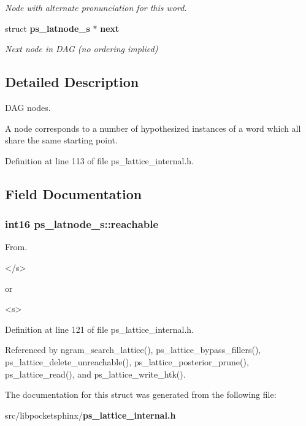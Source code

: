 \begin{DoxyCompactItemize}
\begin{DoxyCompactList}\small\item\em Node with alternate pronunciation for this word. \end{DoxyCompactList}\item 
struct {\bf ps\-\_\-latnode\-\_\-s} $\ast$ {\bf next}\label{structps__latnode__s_aca6f3d543a1712a1ca3bb8ec60f71c84}

\begin{DoxyCompactList}\small\item\em Next node in D\-A\-G (no ordering implied) \end{DoxyCompactList}\end{DoxyCompactItemize}


\subsection{Detailed Description}
D\-A\-G nodes. 

A node corresponds to a number of hypothesized instances of a word which all share the same starting point. 

Definition at line 113 of file ps\-\_\-lattice\-\_\-internal.\-h.



\subsection{Field Documentation}
\subsubsection[{reachable}]{\setlength{\rightskip}{0pt plus 5cm}int16 ps\-\_\-latnode\-\_\-s\-::reachable}\label{structps__latnode__s_af9c4c69f5f85bbc36818357a52432565}


From. 

\begin{DoxyVerb}</s> \end{DoxyVerb}
 or\begin{DoxyVerb}<s> \end{DoxyVerb}
 

Definition at line 121 of file ps\-\_\-lattice\-\_\-internal.\-h.



Referenced by ngram\-\_\-search\-\_\-lattice(), ps\-\_\-lattice\-\_\-bypass\-\_\-fillers(), ps\-\_\-lattice\-\_\-delete\-\_\-unreachable(), ps\-\_\-lattice\-\_\-posterior\-\_\-prune(), ps\-\_\-lattice\-\_\-read(), and ps\-\_\-lattice\-\_\-write\-\_\-htk().



The documentation for this struct was generated from the following file\-:\begin{DoxyCompactItemize}
\item 
src/libpocketsphinx/{\bf ps\-\_\-lattice\-\_\-internal.\-h}\end{DoxyCompactItemize}
